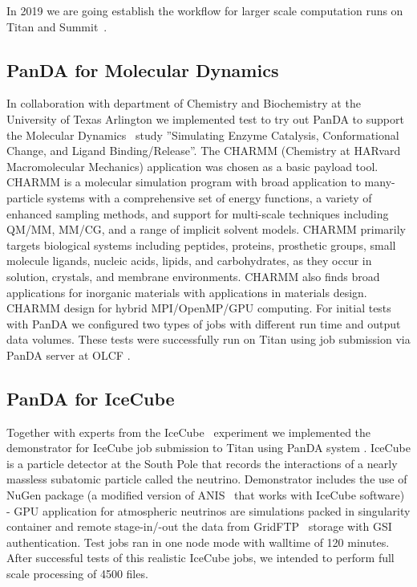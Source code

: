 \documentclass{webofc}
\begin{document}
In 2019 we are going establish the workflow for larger scale computation runs on Titan and Summit~\cite{Summit}.

\subsection{PanDA for Molecular Dynamics} \label{section_moldyn}

In collaboration with department of Chemistry and Biochemistry at the University of Texas Arlington we implemented test to try out PanDA to support the Molecular Dynamics~\cite{3b6dad414e794d36954333f8f177f47c} study ''Simulating Enzyme Catalysis, Conformational Change, and Ligand Binding/Release''. 
The CHARMM (Chemistry at HARvard Macromolecular Mechanics) application was chosen as a basic payload tool. CHARMM is a molecular simulation program with broad application to many-particle systems with a comprehensive set of energy functions, a variety of enhanced sampling methods, and support for multi-scale techniques including QM/MM, MM/CG, and a range of implicit solvent models. CHARMM primarily targets biological systems including peptides, proteins, prosthetic groups, small molecule ligands, nucleic acids, lipids, and carbohydrates, as they occur in solution, crystals, and membrane environments. CHARMM also finds broad applications for inorganic materials with applications in materials design. CHARMM design for hybrid MPI/OpenMP/GPU computing. For initial tests with PanDA we configured two types of jobs with different run time and output data volumes. These tests were successfully run on Titan using job submission via PanDA server at OLCF .


\subsection{PanDA for IceCube} \label{section_icecube}

Together with experts from the IceCube~\cite{doi:10.1063/1.3480478} experiment we implemented the demonstrator for IceCube job submission to Titan using PanDA system . IceCube is a particle detector at the South Pole that records the interactions of a nearly massless subatomic particle called the neutrino. Demonstrator includes the use of NuGen package (a modified version of ANIS~\cite{GAZIZOV2005203} that works with IceCube software) - GPU application for atmospheric neutrinos are simulations packed in singularity container and remote stage-in/-out the data from GridFTP~\cite{GlobusGridFTP} storage with GSI authentication. Test jobs ran in one node mode with walltime of 120 minutes. After successful tests of this realistic IceCube jobs, we intended to perform full scale processing of 4500 files.
\end{document}
